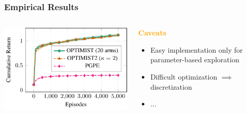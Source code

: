 \documentclass[aspectratio=169, table]{beamer}
\newcommand{\eno}[1]{\textcolor{orange}{\textbf{#1}}}
\begin{document}
\begin{frame} 
\frametitle{Empirical Results} 
\begin{columns}
	\begin{column}{.5\textwidth}
		\includegraphics[]{river.pdf}
	\end{column}
	\begin{column}{.5\textwidth}
		\eno{Caveats}
		\begin{itemize}
			\item Easy implementation only for parameter-based exploration
			\item Difficult optimization $\implies$ discretization
			\item ...
		\end{itemize}
	\end{column}
\end{columns}
\end{frame}
\end{document}
